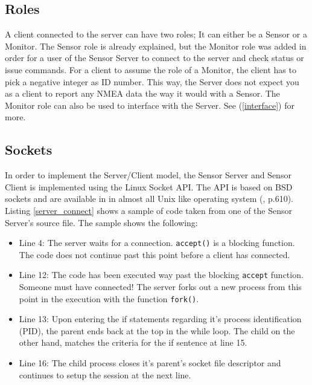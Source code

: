 \documentclass[12pt,english,a4paper]{report}
\begin{document}
\newpage
\subsection{Roles}\label{roles}
A client connected to the server can have two roles; It can either be a Sensor or a Monitor. The Sensor role is already explained, but the Monitor role was added in order for a user of the Sensor Server to connect to the server and check status or issue commands. For a client to assume the role of a Monitor, the client has to pick a negative integer as ID number. This way, the Server does not expect you as a client to report any NMEA data the way it would with a Sensor. The Monitor role can also be used to interface with the Server. See (\ref{interface}) for more.

\subsection{Sockets}\label{sockets}
In order to implement the Server/Client model, the Sensor Server and Sensor Client is implemented using the Linux Socket API. The API is based on BSD sockets and are available in in almost all Unix like operating system (\cite{LINUX_KERNEL}, p.610). Listing \ref{server_connect} shows a sample of code taken from one of the Sensor Server's source file. The sample shows the following:
\begin{itemize}
  \item Line 4: The server waits for a connection. \texttt{accept()} is a blocking function. The code does not continue past this point before a client has connected.  
  \item Line 12: The code has been executed way past the blocking \texttt{accept} function. Someone must have connected! The server forks out a new process from this point in the execution with the function \texttt{fork()}.
  \item Line 13: Upon entering the if statements regarding it's process identification (PID), the parent ends back at the top in the while loop. The child on the other hand, matches the criteria for the if sentence at line 15.
  \item Line 16: The child process closes it's parent's socket file descriptor and continues to setup the session at the next line.
\end{itemize}
\end{document}
